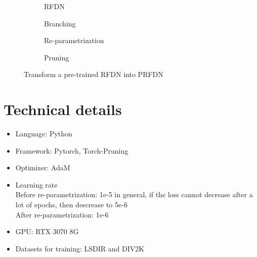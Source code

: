 \documentclass[10pt,twocolumn,letterpaper]{article}
\begin{document}
\begin{figure}
    \centering
    \begin{subfigure}[b]{\linewidth}
		\centering
        \framebox{}
        \caption{RFDN}
        \label{fig:RFDN}
    \end{subfigure}
    \begin{subfigure}[b]{\linewidth}
		\centering
        \framebox{}
        \caption{Branching}
        \label{fig:Branching}
    \end{subfigure}
    \begin{subfigure}[b]{\linewidth}
		\centering
        \framebox{}
        \caption{Re-parametrization}
        \label{fig:Re-parametrization}
    \end{subfigure}
    \begin{subfigure}[b]{\linewidth}
		\centering
        \framebox{}
        \caption{Pruning}
        \label{fig:Pruning}
    \end{subfigure}
    \caption{Transform a pre-trained RFDN into PRFDN}
    \label{fig:PRFDN}
\end{figure}


\section{Technical details}
\begin{itemize}
    \item Language: Python
    \item Framework: Pytorch, Torch-Pruning\cite{fang2023depgraph}
    \item Optimizer: AdaM
    \item Learning rate\\Before re-parametrization: 1e-5 in general, if the loss cannot decrease after a lot of epochs, then descrease to 5e-6\\After re-parametrization: 1e-6
    \item GPU: RTX 3070 8G
    \item Datasets for training: LSDIR and DIV2K
\end{itemize}
\end{document}

